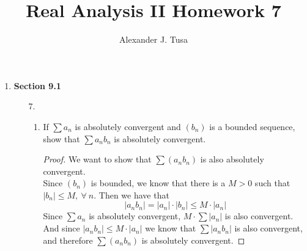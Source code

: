 \documentclass[12pt,letterpaper]{article}
\author{Alexander J. Tusa}
\title{Real Analysis II Homework 7}
\theoremstyle{case}
\theoremstyle{definition}
\begin{document}
	\maketitle
	\begin{enumerate}
		\item \textbf{Section 9.1}
		\begin{enumerate}
			\item[7.]
			\begin{enumerate}
				\item If $\sum a_n$ is absolutely convergent and $(b_n)$ is a bounded sequence, show that $\sum a_nb_n$ is absolutely convergent.
				\begin{proof}
					We want to show that $\sum (a_nb_n)$ is also absolutely convergent.\\
					Since $(b_n)$ is bounded, we know that there is a $M > 0$ such that $|b_n| \leq M,\ \forall\ n$. Then we have that
					\[|a_nb_n|=|a_n|\cdot|b_n|\leq M \cdot |a_n|\]
					Since $\sum a_n$ is absolutely convergent, $M \cdot \sum |a_n|$ is also convergent. And since $|a_nb_n| \leq M \cdot |a_n|$ we know that $\sum |a_nb_n|$ is also convergent, and therefore $\sum (a_nb_n)$ is absolutely convergent.
				\end{proof}
			

\end{enumerate}
\end{enumerate}
\end{enumerate}
\end{document}
